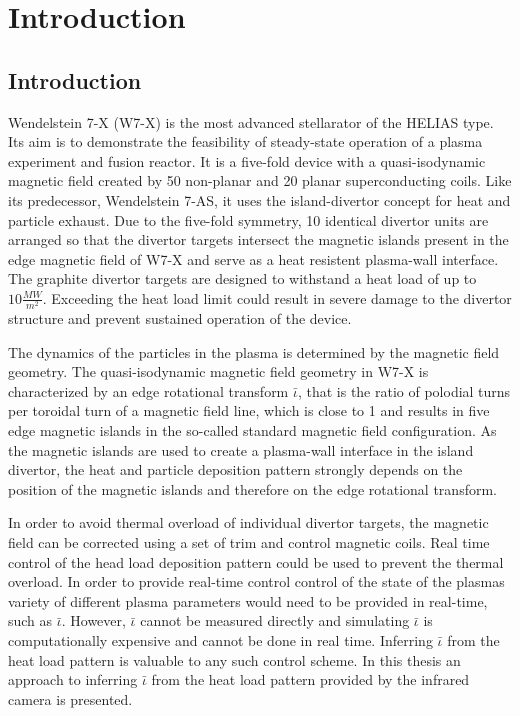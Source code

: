 %
\chapter{Introduction}
\label{sec:intro}

\section{Introduction}
Wendelstein 7-X (W7-X) is the most advanced stellarator of the HELIAS type. Its aim is to demonstrate the feasibility of steady-state operation of a plasma experiment and fusion reactor. It is a five-fold device with a quasi-isodynamic magnetic field created by 50 non-planar and 20 planar superconducting coils. Like its predecessor, Wendelstein 7-AS, it uses the island-divertor concept for heat and particle exhaust. Due to the five-fold symmetry, 10 identical divertor units are arranged so that the divertor targets intersect the magnetic islands present in the edge magnetic field of W7-X and serve as a heat resistent plasma-wall interface. The graphite divertor targets are designed to withstand a heat load of up to $10 \frac{MW}{m^2}$. Exceeding the heat load limit could result in severe damage to the divertor structure and prevent sustained operation of the device.

The dynamics of the particles in the plasma is determined by the magnetic field geometry. The quasi-isodynamic magnetic field geometry in W7-X is characterized by an edge rotational transform $\bar{\iota}$, that is the ratio of polodial turns per toroidal turn of a magnetic field line, which is close to 1 and results in five edge magnetic islands in the so-called standard magnetic field configuration. As the magnetic islands are used to create a plasma-wall interface in the island divertor, the heat and particle deposition pattern strongly depends on the position of the magnetic islands and therefore on the edge rotational transform.

In order to avoid thermal overload of individual divertor targets, the magnetic field can be corrected using a set of trim and control magnetic coils. Real time control of the head load deposition pattern could be used to prevent the thermal overload. In order to provide real-time control control of the state of the plasmas variety of different plasma parameters would need to be provided in real-time, such as $\bar{\iota}$. However, $\bar{\iota}$ cannot be measured directly and simulating $\bar{\iota}$ is computationally expensive and cannot be done in real time. Inferring $\bar{\iota}$ from the heat load pattern is valuable to any such control scheme. In this thesis an approach to inferring $\bar{\iota}$ from the heat load pattern provided by the infrared camera is presented.

